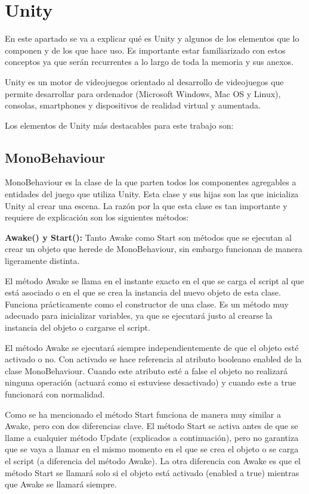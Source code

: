 
\section{Unity}
En este apartado se va a explicar qué es Unity y algunos de los elementos que lo componen y de los que hace uso. Es importante estar familiarizado con estos conceptos ya que serán recurrentes a lo largo de toda la memoria y sus anexos.

Unity es un motor de videojuegos orientado al desarrollo de videojuegos que permite desarrollar para ordenador (Microsoft Windows, Mac OS y Linux), consolas, smartphones y dispositivos de realidad virtual y aumentada.

Los elementos de Unity más destacables para este trabajo son:

\subsection{MonoBehaviour}
MonoBehaviour \cite{ClaseMonobehaviour} es la clase de la que parten todos los componentes agregables a entidades del juego que utiliza Unity. Esta clase y sus hijas son las que inicializa Unity al crear una escena. La razón por la que esta clase es tan importante y requiere de explicación son los siguientes métodos:

\textbf{Awake() y Start():} Tanto Awake como Start son métodos que se ejecutan al crear un objeto que herede de MonoBehaviour, sin embargo funcionan de manera ligeramente distinta. 

El método Awake se llama en el instante exacto en el que se carga el script al que está asociado o en el que se crea la instancia del nuevo objeto de esta clase. Funciona prácticamente como el constructor de una clase. Es un método muy adecuado para inicializar variables, ya que se ejecutará justo al crearse la instancia del objeto o cargarse el script. 

El método Awake se ejecutará siempre independientemente de que el objeto esté activado o no. Con activado se hace referencia al atributo booleano enabled de la clase MonoBehaviour. Cuando este atributo esté a false el objeto no realizará ninguna operación (actuará como si estuviese desactivado) y cuando este a true funcionará con normalidad.

Como se ha mencionado el método Start funciona de manera muy similar a Awake, pero con dos diferencias clave. El método Start se activa antes de que se llame a cualquier método Update (explicados a continuación), pero no garantiza que se vaya a llamar en el mismo momento en el que se crea el objeto o se carga el script (a diferencia del método Awake). La otra diferencia con Awake es que el método Start se llamará solo si el objeto está activado (enabled a true) mientras que Awake se llamará siempre.\\


